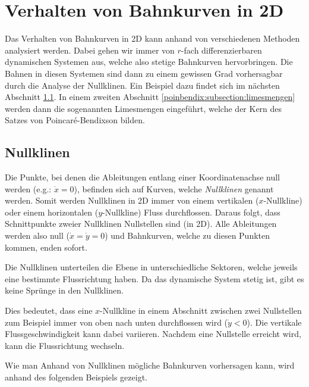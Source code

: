 \section{Verhalten von Bahnkurven in 2D} \label{poinbendix:section:nullklinen}

Das Verhalten von Bahnkurven in 2D kann anhand von verschiedenen Methoden analysiert werden.
Dabei gehen wir immer von $r$-fach differenzierbaren dynamischen Systemen aus, welche also stetige Bahnkurven hervorbringen.
Die Bahnen in diesen Systemen sind dann zu einem gewissen Grad vorhersagbar durch die Analyse der Nullklinen.
Ein Beispiel dazu findet sich im nächsten Abschnitt \ref{poinbendix:subsection:nullklinen}.
In einem zweiten Abschnitt \ref{poinbendix:subsection:limesmengen} werden dann die sogenannten Limesmengen eingeführt, welche der Kern des Satzes von Poincaré-Bendixson bilden.

\subsection{Nullklinen} \label{poinbendix:subsection:nullklinen}

Die Punkte, bei denen die Ableitungen entlang einer Koordinatenachse null werden (e.g.: $\dot{x}=0$), befinden sich auf Kurven, welche \emph{Nullklinen} genannt werden.
Somit werden Nullklinen in 2D immer von einem vertikalen ($x$-Nullkline) oder einem horizontalen ($y$-Nullkline) Fluss durchflossen.
Daraus folgt, dass Schnittpunkte zweier Nullklinen Nullstellen sind (in 2D).
Alle Ableitungen werden also null ($\dot{x}=\dot{y}=0$) und Bahnkurven, welche zu diesen Punkten kommen, enden sofort.

Die Nullklinen unterteilen die Ebene in unterschiedliche Sektoren, welche jeweils eine bestimmte Flussrichtung haben.
Da das dynamische System stetig ist, gibt es keine Sprünge in den Nullklinen.

Dies bedeutet, dass eine $x$-Nullkline in einem Abschnitt zwischen zwei Nullstellen zum Beispiel immer von oben nach unten durchflossen wird ($\dot{y} < 0$).
Die vertikale Flussgeschwindigkeit kann dabei variieren.
Nachdem eine Nullstelle erreicht wird, kann die Flussrichtung wechseln.

Wie man Anhand von Nullklinen mögliche Bahnkurven vorhersagen kann, wird anhand des folgenden Beispiels gezeigt.

